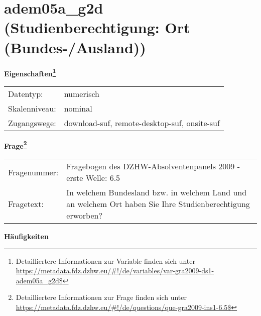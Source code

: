 
    \setcounter{footnote}{0}

    \vspace*{-1.8cm}
	\section{adem05a\_g2d (Studienberechtigung: Ort (Bundes-/Ausland))}
	\label{section:adem05a_g2d}



    \vspace*{0.5cm}
    \noindent\textbf{Eigenschaften\footnote{Detailliertere Informationen zur Variable finden sich unter
		\url{https://metadata.fdz.dzhw.eu/\#!/de/variables/var-gra2009-ds1-adem05a_g2d$}}}\\
	\begin{tabularx}{\hsize}{@{}lX}
	Datentyp: & numerisch \\
	Skalenniveau: & nominal \\
	Zugangswege: &
	  download-suf, 
	  remote-desktop-suf, 
	  onsite-suf
 \\
    \end{tabularx}



				\vspace*{0.5cm}
                \noindent\textbf{Frage\footnote{Detailliertere Informationen zur Frage finden sich unter
		              \url{https://metadata.fdz.dzhw.eu/\#!/de/questions/que-gra2009-ins1-6.5$}}}\\
				\begin{tabularx}{\hsize}{@{}lX}
					Fragenummer: &
					  Fragebogen des DZHW-Absolventenpanels 2009 - erste Welle:
					  6.5
 \\
					Fragetext: & In welchem Bundesland bzw. in welchem Land und an welchem Ort haben Sie Ihre Studienberechtigung erworben? \\
				\end{tabularx}





        		\vspace*{0.5cm}
                \noindent\textbf{Häufigkeiten}

